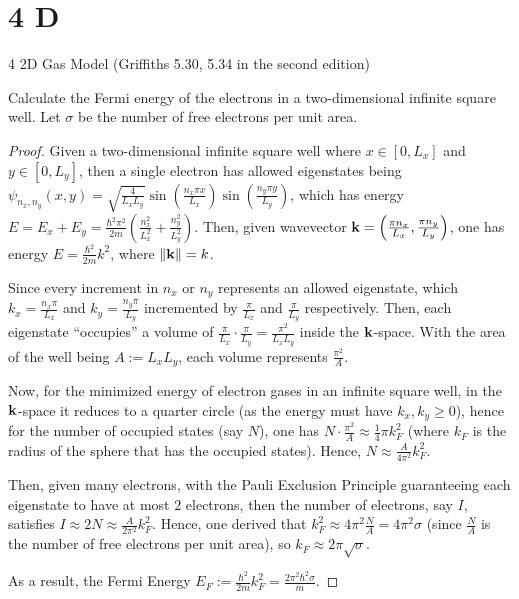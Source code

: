 \documentclass{article}
\begin{document}
\newpage

\section*{4 D}
\begin{ques}
4 2D Gas Model (Griffiths 5.30, 5.34 in the second edition)

Calculate the Fermi energy of the electrons in a two-dimensional infinite square well. Let $\sigma$ be the number of free electrons per unit area.
\end{ques}

\begin{proof}
    Given a two-dimensional infinite square well where $x \in [0,L_x]$ and $y \in [0,L_y]$, then a single electron has allowed eigenstates being $\psi_{n_x,n_y}(x,y)=\sqrt{\frac{4}{L_x L_y}}\sin\left(\frac{n_x \pi x}{L_x}\right)\sin\left(\frac{n_y \pi y}{L_y}\right)$, which has energy $E = E_x+E_y = \frac{\hbar^2\pi^2}{2m}\left(\frac{n_x^2}{L_x^2}+\frac{n_y^2}{L_y^2}\right)$. Then, given wavevector $\mathbf{k} = \left(\frac{\pi n_x}{L_x}, \frac{\pi n_y}{L_y}\right)$, one has energy $E = \frac{\hbar^2}{2m}k^2$, where $\|\mathbf{k}\| = k$.

    \hfil

    Since every increment in $n_x$ or $n_y$ represents an allowed eigenstate, which $k_x = \frac{n_x\pi}{L_x}$ and $k_y=\frac{n_y \pi}{L_y}$ incremented by $\frac{\pi}{L_x}$ and $\frac{\pi}{L_y}$ respectively. Then, each eigenstate ``occupies'' a volume of $\frac{\pi}{L_x} \cdot \frac{\pi}{L_y} = \frac{\pi^2}{L_xL_y}$ inside the $\mathbf{k}$-space. With the area of the well being $A:=L_xL_y$, each volume represents $\frac{\pi^2}{A}$.

    \hfil

    Now, for the minimized energy of electron gases in an infinite square well, in the $\mathbf{k}$-space it reduces to a quarter circle (as the energy must have $k_x,k_y \geq 0$), hence for the number of occupied states (say $N$), one has $N \cdot \frac{\pi^2}{A}\approx \frac{1}{4}\pi k_F^2$ (where $k_F$ is the radius of the sphere that has the occupied states). Hence, $N \approx \frac{A}{4\pi^2}k_F^2$.
    
    Then, given many electrons, with the Pauli Exclusion Principle guaranteeing each eigenstate to have at most $2$ electrons, then the number of electrons, say $I$, satisfies $I \approx 2 N \approx \frac{A}{2\pi^2}k_F^2$. Hence, one derived that $k_F^2 \approx 4\pi^2 \frac{N}{A} = 4\pi^2 \sigma$ (since $\frac{N}{A}$ is the number of free electrons per unit area), so $k_F \approx 2\pi \sqrt{\sigma}$.

    \hfil

    As a result, the Fermi Energy $E_F := \frac{\hbar^2}{2m}k_F^2 = \frac{2\pi^2\hbar^2\sigma}{m}$. 
\end{proof}
\end{document}
